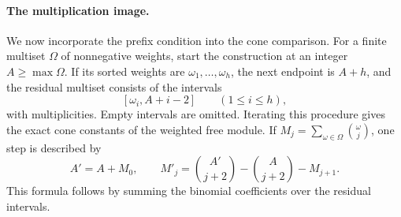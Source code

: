 \documentclass[12pt]{amsart}
\numberwithin{equation}{section}
\theoremstyle{definition}
\theoremstyle{remark}
\numberwithin{equation}{section}
\begin{document}
\paragraph{\textbf{The multiplication image.}}
We now incorporate the prefix condition into the cone comparison. For a finite multiset $\Omega$ of nonnegative weights, start the construction at an integer $A\ge\max\Omega$. If its sorted weights are $\omega_1,\ldots,\omega_h$, the next endpoint is $A+h$, and the residual multiset consists of the intervals
\[
 [\omega_i,A+i-2]\qquad(1\le i\le h),
\]
with multiplicities. Empty intervals are omitted. Iterating this procedure gives the exact cone constants of the weighted free module.
If $M_j=\sum_{\omega\in\Omega}\binom{\omega}{j}$, one step is described by
\begin{equation}\label{eq:cone-moment-recurrence}
 A'=A+M_0,\qquad
 M'_j=\binom{A'}{j+2}-\binom{A}{j+2}-M_{j+1}.
\end{equation}
This formula follows by summing the binomial coefficients over the residual intervals.
\end{document}
